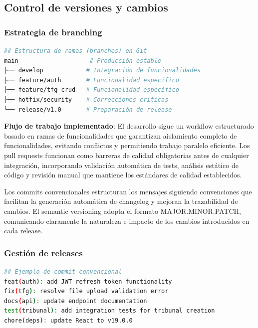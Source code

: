 \documentclass[12pt,a4paper,oneside]{report}
\begin{document}
\subsection{Control de versiones y
cambios}\label{control-de-versiones-y-cambios}

\subsubsection{Estrategia de branching}\label{estrategia-de-branching}

\begin{lstlisting}[language=bash]
## Estructura de ramas (branches) en Git
main                    # Producción estable
├── develop            # Integración de funcionalidades
├── feature/auth       # Funcionalidad específico
├── feature/tfg-crud   # Funcionalidad específico
├── hotfix/security    # Correcciones críticas
└── release/v1.0       # Preparación de release
\end{lstlisting}

\textbf{Flujo de trabajo implementado}: El desarrollo sigue un workflow estructurado basado en ramas de funcionalidades que garantizan aislamiento completo de funcionalidades, evitando conflictos y permitiendo trabajo paralelo eficiente. Los pull requests funcionan como barreras de calidad obligatorias antes de cualquier integración, incorporando validación automática de tests, análisis estático de código y revisión manual que mantiene los estándares de calidad establecidos.

Los commits convencionales estructuran los mensajes siguiendo convenciones que facilitan la generación automática de changelog y mejoran la trazabilidad de cambios. El semantic versioning adopta el formato MAJOR.MINOR.PATCH, comunicando claramente la naturaleza e impacto de los cambios introducidos en cada release.

\subsubsection{Gestión de releases}\label{gestiuxf3n-de-releases}

\begin{lstlisting}[language=bash]
## Ejemplo de commit convencional
feat(auth): add JWT refresh token functionality
fix(tfg): resolve file upload validation error
docs(api): update endpoint documentation
test(tribunal): add integration tests for tribunal creation
chore(deps): update React to v19.0.0
\end{lstlisting}
\end{document}
